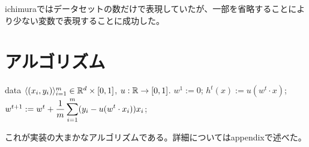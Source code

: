 ichimuraではデータセットの数だけで表現していたが、一部を省略することにより少ない変数で表現することに成功した。


\section{アルゴリズム}


\begin{algorithm}[]
	\caption{\KAF}
	\label{alg:fixed-u-alg}
\begin{algorithmic}
	 data $\langle (x_i, y_i) \rangle_{i=1}^m \in
	\mathbb{R}^d \times [0, 1]$, $u: \mathbb{R} \rightarrow [0, 1]$.
	\STATE $w^1 := 0$;
	\STATE $h^t(x) := u(w^t \cdot x)$;
	\STATE $w^{t+1} := w^t + \displaystyle\frac{1}{m} \sum_{i=1}^m (y_i - u(w^t
	\cdot x_i)) x_i$;
	\ENDFOR
\end{algorithmic}
\end{algorithm}

これが実装の大まかなアルゴリズムである。詳細についてはappendixで述べた。




